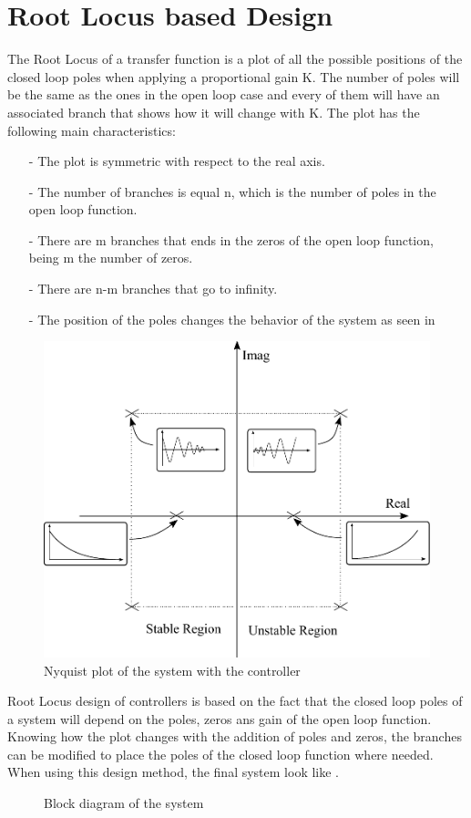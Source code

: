 \section{Root Locus based Design}\label{rLocus}
The Root Locus of a transfer function is a plot of all the possible positions of the closed loop poles when applying a proportional gain K. The number of poles will be the same as the ones in the open loop case and every of them will have an associated branch that shows how it will change with K. The plot has the following main characteristics:

\begin{itemize}
	\item[-] The plot is symmetric with respect to the real axis.
	\item[-] The number of branches is equal n, which is the number of poles in the open loop function.
	\item[-] There are m branches that ends in the zeros of the open loop function, being m the number of zeros.
	\item[-] There are n-m branches that go to infinity.
	\item[-] The position of the poles changes the behavior of the system as seen in 
\end{itemize}

\begin{figure}[H] 
	\centering 
	\includegraphics[scale=0.5]{figures/rLocusStability}	
	\caption{Nyquist plot of the system with the controller}
	\label{rLocusStability}
\end{figure}
%
Root Locus design of controllers is based on the fact that the closed loop poles of a system will depend on the poles, zeros ans gain of the open loop function. Knowing how the plot changes with the addition of poles and zeros, the branches can be modified to place the poles of the closed loop function where needed. When using this design method, the final system look like .

\begin{figure}[H]
	
	\centering
	\caption{Block diagram of the system}
	\label{blockDiagramController}
\end{figure}

